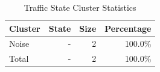 \begin{table}[h]
\centering
\caption{Traffic State Cluster Statistics}
\label{tab:cluster_stats}
\begin{tabular}{lrrr}
\hline
Cluster & State & Size & Percentage \\
\hline
Noise & - & 2 & 100.0\% \\
\hline
Total & - & 2 & 100.0\% \\
\hline
\end{tabular}
\end{table}